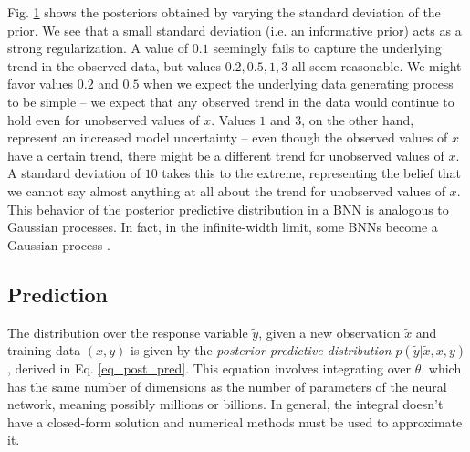 \documentclass[12pt]{article}
\begin{document}
{Fig. \ref{fig_1d_predictions_by_stdev} shows the posteriors obtained by varying the standard deviation of the prior. We see that a small standard deviation (i.e. an informative prior) acts as a strong regularization. A value of $0.1$ seemingly fails to capture the underlying trend in the observed data, but values $0.2, 0.5, 1, 3$ all seem reasonable. We might favor values $0.2$ and $0.5$ when we expect the underlying data generating process to be simple -- we expect that any observed trend in the data would continue to hold even for unobserved values of $x$. Values $1$ and $3$, on the other hand, represent an increased model uncertainty -- even though the observed values of $x$ have a certain trend, there might be a different trend for unobserved values of $x$. A standard deviation of $10$ takes this to the extreme, representing the belief that we cannot say almost anything at all about the trend for unobserved values of $x$. This behavior of the posterior predictive distribution in a BNN is analogous to Gaussian processes. In fact, in the infinite-width limit, some BNNs become a Gaussian process \cite{neural_tangents}.

\begin{figure}[H]
\centering
{}
\caption{}
\label{fig_1d_predictions_by_stdev}
\end{figure}

\subsection{Prediction}
\label{sec_prediction}

The distribution over the response variable $\tilde{y}$, given a new observation $\tilde{x}$ and training data $(x, y)$ is given by the \textit{posterior predictive distribution} $p(\tilde{y} | \tilde{x}, x, y)$, derived in Eq. \ref{eq_post_pred}. This equation involves integrating over $\theta$, which has the same number of dimensions as the number of parameters of the neural network, meaning possibly millions or billions. In general, the integral doesn't have a closed-form solution and numerical methods must be used to approximate it.

}
\end{document}
